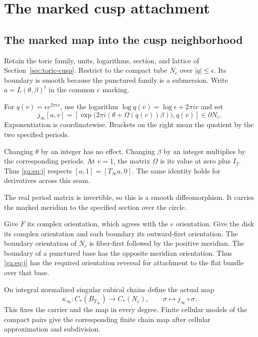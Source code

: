 \section{The marked cusp attachment}\label{sec:cusp-attachment}

\subsection{The marked map into the cusp neighborhood}

Retain the toric family, units, logarithms, section, and lattice
of Section~\ref{sec:toric-cusp}. Restrict to the compact tube $N_c$ over $|q|\leq\epsilon$.
Its boundary is smooth because the punctured family is a submersion.
Write $a=L(\theta,\beta)^t$ in the common $e$ marking.

For $q(v)=\epsilon e^{2\pi iv}$, use the logarithm
$\log q(v)=\log\epsilon+2\pi iv$ and set
\begin{equation}\label{ga:eq:j}
j_\infty[a,v]=
\left[\exp\bigl(2\pi i(\theta+\Omega(q(v))\beta)\bigr),q(v)\right]
\in\partial N_c.
\end{equation}
Exponentiation is coordinatewise. Brackets on the right mean the
quotient by the two specified periods.

Changing $\theta$ by an integer has no effect.
Changing $\beta$ by an integer multiplies by the corresponding periods.
At $v=1$, the matrix $\Omega$ is its value at zero plus $I_2$.
Thus \eqref{ga:eq:j} respects $[a,1]=[T_\infty a,0]$.
The same identity holds for derivatives across this seam.

The real period matrix is invertible, so this is a smooth diffeomorphism.
It carries the marked meridian to the specified section over the circle.

Give $F$ its complex orientation, which agrees with the $e$ orientation.
Give the disk its complex orientation and each boundary its outward-first
orientation. The boundary orientation of $N_c$ is fiber-first followed
by the positive meridian. The boundary of a punctured base has the
opposite meridian orientation. Thus \eqref{ga:eq:j} has the required
orientation reversal for attachment to the flat bundle over that base.

On integral normalized singular cubical chains define the actual map
\begin{equation}\label{ga:eq:kappa}
\kappa_\infty:C_*(B_{T_\infty})\longrightarrow C_*(N_c),
\qquad \sigma\longmapsto j_\infty\circ\sigma.
\end{equation}
This fixes the carrier and the map in every degree.
Finite cellular models of the compact pairs give the corresponding
finite chain map after cellular approximation and subdivision.

